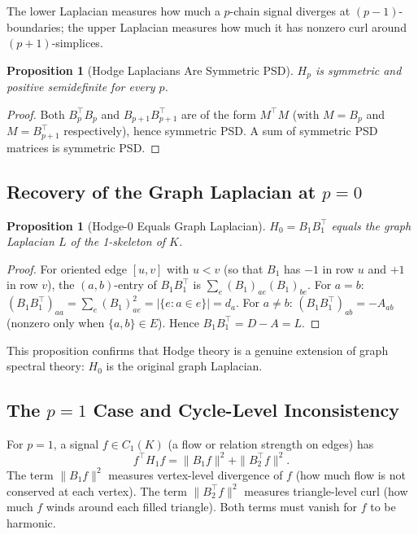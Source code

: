 \documentclass[11pt]{article}
\newtheorem{proposition}[theorem]{Proposition}
\theoremstyle{definition}
\theoremstyle{remark}
\begin{document}
The lower Laplacian measures how much a $p$-chain signal diverges at
$(p-1)$-boundaries; the upper Laplacian measures how much it has nonzero curl
around $(p+1)$-simplices.

\begin{proposition}[Hodge Laplacians Are Symmetric PSD]
\label{prop:hodge_psd}
$H_p$ is symmetric and positive semidefinite for every $p$.
\end{proposition}

\begin{proof}
Both $B_p^\top B_p$ and $B_{p+1}B_{p+1}^\top$ are of the form $M^\top M$
(with $M=B_p$ and $M=B_{p+1}^\top$ respectively), hence symmetric PSD. A sum
of symmetric PSD matrices is symmetric PSD.
\end{proof}

\subsection{\texorpdfstring{Recovery of the Graph Laplacian at $p=0$}{Recovery of the Graph Laplacian at p=0}}

\begin{proposition}[Hodge-0 Equals Graph Laplacian]
\label{prop:h0}
$H_0 = B_1 B_1^\top$ equals the graph Laplacian $L$ of the 1-skeleton of $K$.
\end{proposition}

\begin{proof}
For oriented edge $[u,v]$ with $u<v$ (so that $B_1$ has $-1$ in row $u$ and
$+1$ in row $v$), the $(a,b)$-entry of $B_1 B_1^\top$ is
$\sum_e (B_1)_{ae}(B_1)_{be}$. For $a=b$: $(B_1 B_1^\top)_{aa} = \sum_e
(B_1)_{ae}^2 = |\{e : a \in e\}| = d_a$. For $a\neq b$: $(B_1B_1^\top)_{ab}
= -A_{ab}$ (nonzero only when $\{a,b\}\in E$). Hence $B_1B_1^\top = D-A = L$.
\end{proof}

This proposition confirms that Hodge theory is a genuine extension of graph
spectral theory: $H_0$ is the original graph Laplacian.

\subsection{\texorpdfstring{The $p=1$ Case and Cycle-Level Inconsistency}{The p=1 Case and Cycle-Level Inconsistency}}

For $p=1$, a signal $f\in C_1(K)$ (a flow or relation strength on edges) has
\[
  f^\top H_1 f = \|B_1 f\|^2 + \|B_2^\top f\|^2.
\]
The term $\|B_1 f\|^2$ measures vertex-level divergence of $f$ (how much flow
is not conserved at each vertex). The term $\|B_2^\top f\|^2$ measures
triangle-level curl (how much $f$ winds around each filled triangle). Both
terms must vanish for $f$ to be harmonic.
\end{document}
